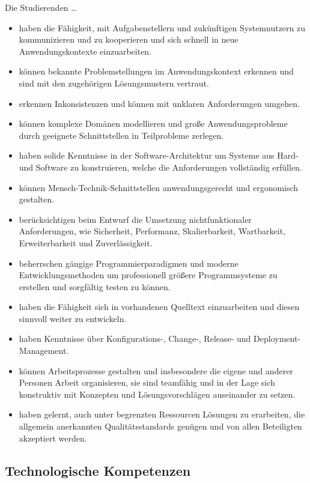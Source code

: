 Die Studierenden \ldots{}

\begin{itemize}
\tightlist
\item
  haben die Fähigkeit, mit Aufgabenstellern und zukünftigen
  Systemnutzern zu kommunizieren und zu kooperieren und sich schnell in
  neue Anwendungskontexte einzuarbeiten.
\item
  können bekannte Problemstellungen im Anwendungskontext erkennen und
  sind mit den zugehörigen Lösungsmustern vertraut.
\item
  erkennen Inkonsistenzen und können mit unklaren Anforderungen umgehen.
\item
  können komplexe Domänen modellieren und große Anwendungsprobleme durch
  geeignete Schnittstellen in Teilprobleme zerlegen.
\item
  haben solide Kenntnisse in der Software-Architektur um Systeme aus
  Hard- und Software zu konstruieren, welche die Anforderungen
  vollständig erfüllen.
\item
  können Mensch-Technik-Schnittstellen anwendungsgerecht und ergonomisch
  gestalten.
\item
  berücksichtigen beim Entwurf die Umsetzung nichtfunktionaler
  Anforderungen, wie Sicherheit, Performanz, Skalierbarkeit,
  Wartbarkeit, Erweiterbarkeit und Zuverlässigkeit.
\item
  beherrschen gängige Programmierparadigmen und moderne
  Entwicklungsmethoden um professionell größere Programmsysteme zu
  erstellen und sorgfältig testen zu können.
\item
  haben die Fähigkeit sich in vorhandenen Quelltext einzuarbeiten und
  diesen sinnvoll weiter zu entwickeln.
\item
  haben Kenntnisse über Konfigurations-, Change-, Release- und
  Deployment-Management.
\item
  können Arbeitsprozesse gestalten und insbesondere die eigene und
  anderer Personen Arbeit organisieren, sie sind teamfähig und in der
  Lage sich konstruktiv mit Konzepten und Lösungsvorschlägen auseinander
  zu setzen.
\item
  haben gelernt, auch unter begrenzten Ressourcen Lösungen zu
  erarbeiten, die allgemein anerkannten Qualitätsstandards genügen und
  von allen Beteiligten akzeptiert werden.
\end{itemize}

\subsection{Technologische
Kompetenzen}\label{technologische-kompetenzen}

